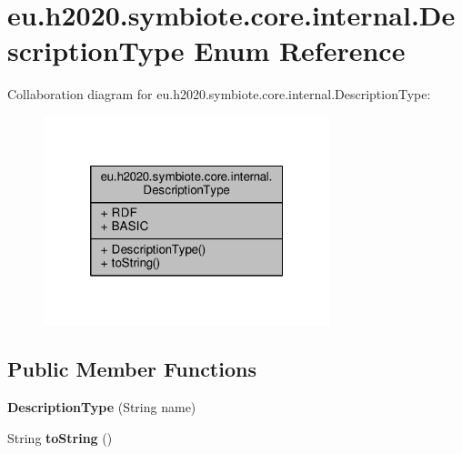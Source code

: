 \hypertarget{enumeu_1_1h2020_1_1symbiote_1_1core_1_1internal_1_1DescriptionType}{}\section{eu.\+h2020.\+symbiote.\+core.\+internal.\+Description\+Type Enum Reference}
\label{enumeu_1_1h2020_1_1symbiote_1_1core_1_1internal_1_1DescriptionType}


Collaboration diagram for eu.\+h2020.\+symbiote.\+core.\+internal.\+Description\+Type\+:
\nopagebreak
\begin{figure}[H]
\begin{center}
\leavevmode
\includegraphics[width=236pt]{enumeu_1_1h2020_1_1symbiote_1_1core_1_1internal_1_1DescriptionType__coll__graph}
\end{center}
\end{figure}
\subsection*{Public Member Functions}
\begin{DoxyCompactItemize}
\item 
\mbox{\label{enumeu_1_1h2020_1_1symbiote_1_1core_1_1internal_1_1DescriptionType_a27392c775b612f7526bf1ccbea87db7a}} 
{\bfseries Description\+Type} (String name)
\item 
\mbox{\label{enumeu_1_1h2020_1_1symbiote_1_1core_1_1internal_1_1DescriptionType_a9076432c04e23d61ffd25498990f1766}} 
String {\bfseries to\+String} ()
\end{DoxyCompactItemize}
